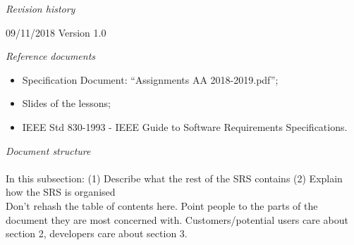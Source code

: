 \documentclass{article}
\begin{document}
\begin{legal}
\begin{legal}
		\item \textit{Revision history}\\
		{\normalfont
			\begin{legal}
			\item 09/11/2018		Version 1.0\\
			\end{legal}
		}
		\item \textit{Reference documents}\\
		{\normalfont	
			\begin{itemize}
			\item Specification Document: “Assignments AA 2018-2019.pdf”;\\
			\item Slides of the lessons;\\
			\item IEEE Std 830-1993 - IEEE Guide to Software Requirements Specifications.\\
			\end{itemize}
		}
		\item \textit{Document structure}\\\\
		{\normalfont
In this subsection:
(1)	Describe what the rest of the SRS contains
(2)	Explain how the SRS is organised
\\
Don’t rehash the table of contents here.  Point people to the parts of the document they are most concerned with.  Customers/potential users care about section 2, developers care about section 3.
		}
		\end{legal}


\end{legal}
\end{document}
